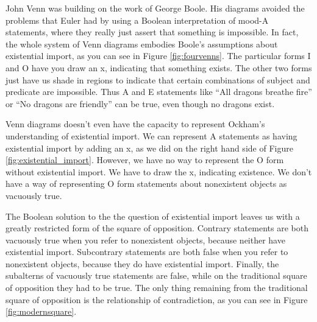 John Venn was building on the work of George Boole. His diagrams avoided the problems that Euler had by using a Boolean interpretation of mood-A statements, where they really just assert that something is impossible. In fact, the whole system of Venn diagrams embodies Boole's assumptions about existential import, as you can see in Figure \ref{fig:fourvenns}. The particular forms I and O have you draw an x, indicating that something exists. The other two forms just have us shade in regions to indicate that certain combinations of subject and predicate are impossible. Thus A and E statements like ``All dragons breathe fire'' or ``No dragons are friendly'' can be true, even though no dragons exist.

Venn diagrams doesn't even have the capacity to represent Ockham's understanding of existential import. We can represent A statements as having existential import by adding an x, as we did on the right hand side of Figure \ref{fig:existential_import}. However, we have no way to represent the O form without existential import. We have to draw the x, indicating existence. We don't have a way of representing O form statements about nonexistent objects as vacuously true.

The Boolean solution to the the question of existential import leaves us with a greatly restricted form of the square of opposition. Contrary statements are both vacuously true when you refer to nonexistent objects, because neither have existential import. Subcontrary statements are both false when you refer to nonexistent objects, because they do have existential import. Finally, the subalterns of vacuously true statements are false, while on the traditional square of opposition they had to be true. The only thing remaining from the traditional square of opposition is the relationship of contradiction, as you can see in Figure \ref{fig:modernsquare}.

